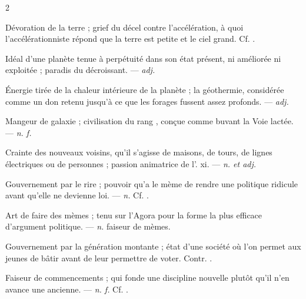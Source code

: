 \begin{multicols}{2}

  Dévoration de la terre ; grief du décel contre l'accélération, à quoi l'accélérationniste répond que la terre est petite et le ciel grand. Cf. .

 Idéal d'une planète tenue à perpétuité dans son état présent, ni améliorée ni exploitée ; paradis du décroissant. —  \textit{adj.}

 Énergie tirée de la chaleur intérieure de la planète ; la géothermie, considérée comme un don retenu jusqu'à ce que les forages fussent assez profonds. —  \textit{adj.}

 Mangeur de galaxie ; civilisation du rang , conçue comme buvant la Voie lactée. —  \textit{n. f.}

 Crainte des nouveaux voisins, qu'il s'agisse de maisons, de tours, de lignes électriques ou de personnes ; passion animatrice de l'.   xi. —  \textit{n. et adj.}

 Gouvernement par le rire ; pouvoir qu'a le mème de rendre une politique ridicule avant qu'elle ne devienne loi. —  \textit{n.} Cf. .

 Art de faire des mèmes ; tenu sur l'Agora pour la forme la plus efficace d'argument politique.   —  \textit{n.} faiseur de mèmes.

 Gouvernement par la génération montante ; état d'une société où l'on permet aux jeunes de bâtir avant de leur permettre de voter. Contr. .

 Faiseur de commencements ; qui fonde une discipline nouvelle plutôt qu'il n'en avance une ancienne. —  \textit{n. f.} Cf. .


\end{multicols}
